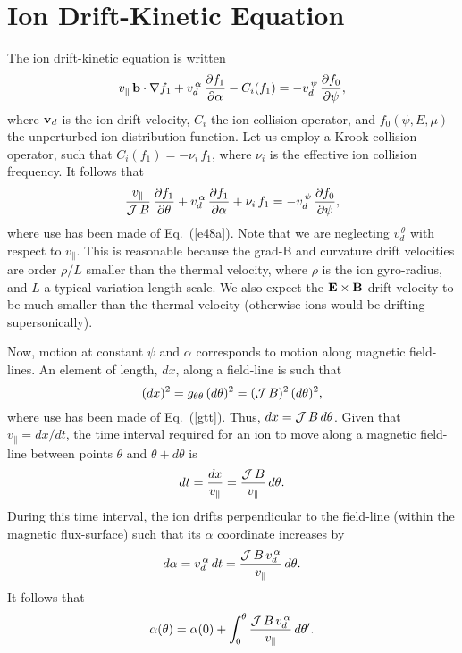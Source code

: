 \documentclass[12pt,prb,aps,notitlepage]{revtex4-1}
\begin{document}
\section{Ion Drift-Kinetic Equation}
 The ion drift-kinetic equation is written
 \begin{equation}
 v_\parallel\,{\bf b}\cdot\nabla f_1 + v_d^{\,\alpha}\,\frac{\partial f_1}{\partial\alpha} - C_i(f_1)=- v_d^{\,\psi}\,\frac{\partial f_0}{\partial\psi},
 \end{equation}
 where ${\bf v}_d$ is the ion drift-velocity, $C_i$ the ion collision operator, and $f_0(\psi,E,\mu)$ the unperturbed ion distribution function. Let us
 employ a Krook collision operator, such that $C_i(f_1)= - \nu_i\,f_1$, where $\nu_i$ is the effective ion collision frequency. It follows that
 \begin{equation}\label{e71}
 \frac{v_\parallel}{{\cal J}\,B}\,\frac{\partial f_1}{\partial\theta} + v_d^{\,\alpha}\,\frac{\partial f_1}{\partial\alpha} + \nu_i\,f_1= - v_d^{\,\psi}\,\frac{\partial f_0}{\partial\psi},
 \end{equation}
 where use has been made of Eq.~(\ref{e48a}).
 Note that we are neglecting $v_d^{\,\theta}$ with respect to $v_\parallel$. This is reasonable because the grad-B and curvature drift velocities are
 order $\rho/L$ smaller than the thermal velocity, where $\rho$ is the ion gyro-radius, and $L$ a typical variation length-scale. We also
 expect the ${\bf E}\times{\bf B}$ drift velocity to be much smaller than the thermal velocity (otherwise ions would be drifting supersonically). 
 
 Now, motion at constant $\psi$ and $\alpha$ corresponds to motion along magnetic field-lines. An element of length, $dx$, along
 a field-line is such that
 \begin{equation}
 (dx)^2 = g_{\theta\theta}\,(d\theta)^2= ({\cal J}\,B)^2\,(d\theta)^2,
 \end{equation}
 where use has been made of Eq.~(\ref{gtt}). Thus, $dx = {\cal J}\,B\,d\theta$. Given that $v_\parallel = dx/dt$, the time interval required for an ion to move along a
 magnetic field-line between points  $\theta$ and $\theta+d\theta$ is
 \begin{equation}\label{dt}
 dt = \frac{dx}{v_\parallel} =\frac{{\cal J}\,B}{v_\parallel}\,d\theta.
 \end{equation}
 During this time interval, the ion drifts perpendicular to the field-line (within the magnetic flux-surface) such that its $\alpha$ coordinate
 increases by
 \begin{equation}
 d\alpha =v_d^{\,\alpha}\,dt =\frac{{\cal J}\,B\,v_d^{\,\alpha}}{v_\parallel}\,d\theta.
 \end{equation}
 It follows that
 \begin{equation}
 \alpha(\theta)= \alpha(0) + \int_0^\theta\frac{{\cal J}\,B\,v_d^{\,\alpha}}{v_\parallel}\,d\theta'.
 \end{equation}
 
\end{document}
